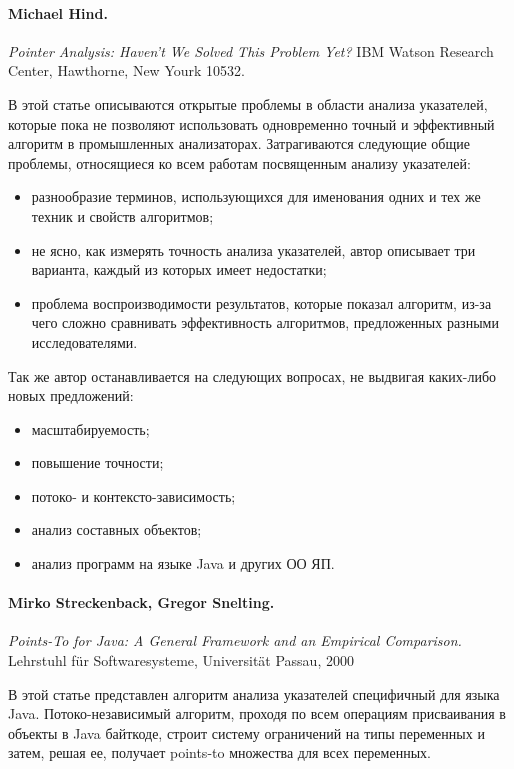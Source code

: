 \documentclass[12pt]{article}
\newcommand{\eng}[1]{{\English#1}}
\begin{document}
    \paragraph{Michael Hind.}
      \eng{
        \textit{Pointer Analysis: Haven't We Solved This Problem Yet?}
        IBM Watson Research Center, Hawthorne, New Yourk 10532.
      }

      В этой статье описываются открытые проблемы в области анализа указателей,
      которые пока не позволяют использовать одновременно точный и эффективный
      алгоритм в промышленных анализаторах.
      Затрагиваются следующие общие проблемы, относящиеся ко всем работам
      посвященным анализу указателей:
      \begin{itemize}
        \item разнообразие терминов, использующихся
          для именования одних и тех же техник и свойств алгоритмов;
        \item не ясно, как измерять точность анализа
          указателей, автор описывает три варианта, каждый из которых имеет
          недостатки;
        \item проблема воспроизводимости результатов, которые показал алгоритм,
          из-за чего сложно сравнивать эффективность алгоритмов, предложенных
          разными исследователями.
      \end{itemize}

      Так же автор останавливается на следующих вопросах, не выдвигая
      каких-либо новых предложений:
      \begin{itemize}
        \item масштабируемость;
        \item повышение точности;
        \item потоко- и контексто-зависимость;
        \item анализ составных объектов;
        \item анализ программ на языке Java и других ОО ЯП.
      \end{itemize}

    \paragraph{Mirko Streckenback, Gregor Snelting.}
      \eng{
        \textit{Points-To for Java: A General Framework and
          an Empirical Comparison.}
        Lehrstuhl für Softwaresysteme, Universität Passau,
        2000
      }

      В этой статье представлен алгоритм анализа указателей специфичный для
      языка Java. Потоко-независимый алгоритм, проходя по всем операциям
      присваивания в объекты в \eng{Java} байткоде, строит систему ограничений
      на типы переменных и затем, решая ее, получает \eng{points-to} множества
      для всех переменных.
\end{document}

